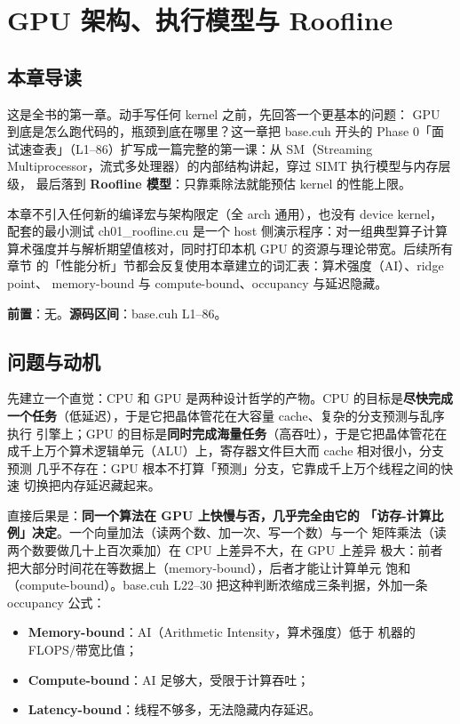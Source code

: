 \chapter{GPU 架构、执行模型与 Roofline}\label{ch:01}

\section{本章导读}

这是全书的第一章。动手写任何 kernel 之前，先回答一个更基本的问题：
GPU 到底是怎么跑代码的，瓶颈到底在哪里？这一章把 base.cuh 开头的
Phase 0「面试速查表」（L1--86）扩写成一篇完整的第一课：从 SM（Streaming
Multiprocessor，流式多处理器）的内部结构讲起，穿过 SIMT 执行模型与内存层级，
最后落到 \textbf{Roofline 模型}：只靠乘除法就能预估 kernel 的性能上限。

本章不引入任何新的编译宏与架构限定（全 arch 通用），也没有 device kernel，
配套的最小测试 ch01\_roofline.cu 是一个 host 侧演示程序：对一组典型算子计算
算术强度并与解析期望值核对，同时打印本机 GPU 的资源与理论带宽。后续所有章节
的「性能分析」节都会反复使用本章建立的词汇表：算术强度（AI）、ridge point、
memory-bound 与 compute-bound、occupancy 与延迟隐藏。

\textbf{前置}：无。\textbf{源码区间}：base.cuh L1--86。

\section{问题与动机}

先建立一个直觉：CPU 和 GPU 是两种设计哲学的产物。CPU 的目标是\textbf{尽快完成
一个任务}（低延迟），于是它把晶体管花在大容量 cache、复杂的分支预测与乱序执行
引擎上；GPU 的目标是\textbf{同时完成海量任务}（高吞吐），于是它把晶体管花在
成千上万个算术逻辑单元（ALU）上，寄存器文件巨大而 cache 相对很小，分支预测
几乎不存在：GPU 根本不打算「预测」分支，它靠成千上万个线程之间的快速
切换把内存延迟藏起来。

直接后果是：\textbf{同一个算法在 GPU 上快慢与否，几乎完全由它的
「访存-计算比例」决定}。一个向量加法（读两个数、加一次、写一个数）与一个
矩阵乘法（读两个数要做几十上百次乘加）在 CPU 上差异不大，在 GPU 上差异
极大：前者把大部分时间花在等数据上（memory-bound），后者才能让计算单元
饱和（compute-bound）。base.cuh L22--30 把这种判断浓缩成三条判据，外加一条
occupancy 公式：

\begin{itemize}
\item \textbf{Memory-bound}：AI（Arithmetic Intensity，算术强度）低于
  机器的 FLOPS$/$带宽比值；
\item \textbf{Compute-bound}：AI 足够大，受限于计算吞吐；
\item \textbf{Latency-bound}：线程不够多，无法隐藏内存延迟。
\end{itemize}

